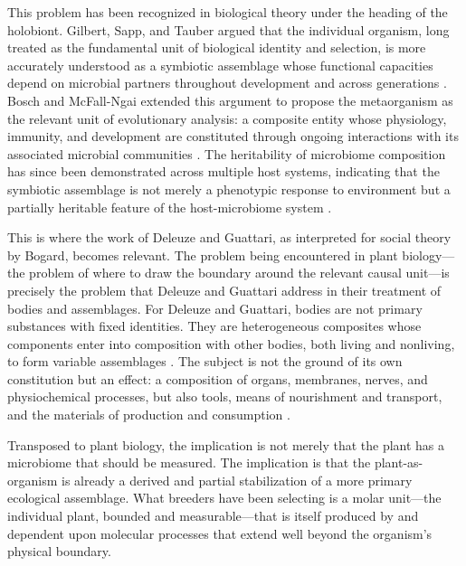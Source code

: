\documentclass[11pt, a4paper]{article}
\begin{document}
This problem has been recognized in biological theory under the heading of the holobiont. Gilbert, Sapp, and Tauber argued that the individual organism, long treated as the fundamental unit of biological identity and selection, is more accurately understood as a symbiotic assemblage whose functional capacities depend on microbial partners throughout development and across generations \citep{gilbert2012}. Bosch and McFall-Ngai extended this argument to propose the metaorganism as the relevant unit of evolutionary analysis: a composite entity whose physiology, immunity, and development are constituted through ongoing interactions with its associated microbial communities \citep{bosch2014}. The heritability of microbiome composition has since been demonstrated across multiple host systems, indicating that the symbiotic assemblage is not merely a phenotypic response to environment but a partially heritable feature of the host-microbiome system \citep{morris2024}.

This is where the work of Deleuze and Guattari, as interpreted for social theory by Bogard, becomes relevant. The problem being encountered in plant biology---the problem of where to draw the boundary around the relevant causal unit---is precisely the problem that Deleuze and Guattari address in their treatment of bodies and assemblages. For Deleuze and Guattari, bodies are not primary substances with fixed identities. They are heterogeneous composites whose components enter into composition with other bodies, both living and nonliving, to form variable assemblages \citep{bogard1998}. The subject is not the ground of its own constitution but an effect: a composition of organs, membranes, nerves, and physiochemical processes, but also tools, means of nourishment and transport, and the materials of production and consumption \citep{bogard1998}.

Transposed to plant biology, the implication is not merely that the plant has a microbiome that should be measured. The implication is that the plant-as-organism is already a derived and partial stabilization of a more primary ecological assemblage. What breeders have been selecting is a molar unit---the individual plant, bounded and measurable---that is itself produced by and dependent upon molecular processes that extend well beyond the organism's physical boundary.
\end{document}
